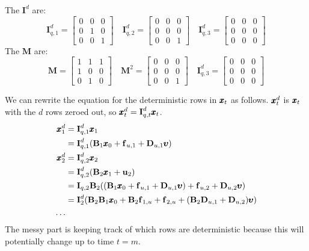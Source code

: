 \documentclass[]{article}
\def\uupsilon{\pmb{\upsilon}}
\def\UPS{\mbox{\boldmath $\Upsilon$}}
\def\BB{\mbox{$\mathbf B$}}	\def\bb{\mbox{$\mathbf b$}} \def\Bb{\mbox{$\mathbf J$}} \def\Ba{\mbox{$\mathbf L$}} \def\Bm{\UPS}
\def\DD{\mbox{$\mathbf D$}}	\def\dd{\mbox{$\mathbf d$}}
\def\II{\mbox{$\mathbf I$}} \def\ii{\mbox{$\mathbf i$}}
\def\MM{\mbox{$\mathbf M$}}  \def\mm{\mbox{$\mathbf m$}}
\begin{document}
The $\II^d$ are:
\begin{equation}
\II_{q,1}^d=\begin{bmatrix}
0&0&0\\
0&1&0\\
0&0&1
\end{bmatrix}
\quad
\II_{q,2}^d=\begin{bmatrix}
0&0&0\\
0&0&0\\
0&0&1
\end{bmatrix}
\quad
\II_{q,3}^d=\begin{bmatrix}
0&0&0\\
0&0&0\\
0&0&0
\end{bmatrix}
\end{equation}
The $\MM$ are:
\begin{equation}
\MM=\begin{bmatrix}
1&1&1\\
1&0&0\\
0&1&0
\end{bmatrix}
\quad
\MM^2=\begin{bmatrix}
0&0&0\\
0&0&0\\
0&0&1
\end{bmatrix}
\quad
\II_{q,3}^d=\begin{bmatrix}
0&0&0\\
0&0&0\\
0&0&0
\end{bmatrix}
\end{equation}

We can rewrite the equation for the deterministic rows in $\mbox{$\pmb{x}$}_t$ as follows. $\mbox{$\pmb{x}$}_t^d$ is $\mbox{$\pmb{x}$}_t$ with the $d$ rows zeroed out, so $\xx_t^d = \II_{q,t}^d\xx_t$.
\begin{equation} \label{eq:xt.det.sum}
\begin{split}
\xx_1^{d}&=\II_{q,1}^d\xx_1\\
         &=\II_{q,1}^d(\BB_1 \xx_0 + \ff_{u,1} + \DD_{u,1}\uupsilon) \\
\xx_2^{d}&=\II_{q,2}^d\xx_2\\
         &=\II_{q,2}^d(\BB_2 \xx_1 + \uu_2)  \\
         &=\II_{q,2}\BB_2((\BB_1 \xx_0 + \ff_{u,1} + \DD_{u,1}\uupsilon) + \ff_{u,2} + \DD_{u,2}\uupsilon) \\
         &=\II_2^d(\BB_2\BB_1 \xx_0 + \BB_2\ff_{1,u} + \ff_{2,u} + (\BB_2\DD_{u,1} +\DD_{u,2})\uupsilon) \\
         \dots \\
\end{split}
\end{equation}
The messy part is keeping track of which rows are deterministic because this will potentially change up to time $t=m$.
\end{document}
